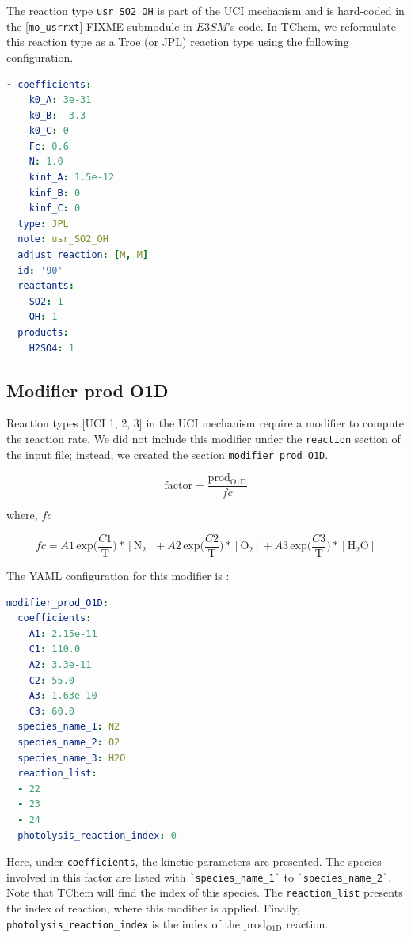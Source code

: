 \documentclass[report, 12pt]{SANDreport}
\newcommand{\eee}{E3SM}
\begin{document}
The reaction type \verb|usr_SO2_OH| is part of the UCI mechanism and is hard-coded in the [\verb|mo_usrrxt|]
FIXME%
submodule in $\eee$'s code. In TChem, we reformulate this reaction type as a Troe (or JPL) reaction type using the following configuration.

\begin{lstlisting}[language=yaml]
- coefficients:
    k0_A: 3e-31
    k0_B: -3.3
    k0_C: 0
    Fc: 0.6
    N: 1.0
    kinf_A: 1.5e-12
    kinf_B: 0
    kinf_C: 0
  type: JPL
  note: usr_SO2_OH
  adjust_reaction: [M, M]
  id: '90'
  reactants:
    SO2: 1
    OH: 1
  products:
    H2SO4: 1
\end{lstlisting}

\subsection{Modifier prod O1D}

Reaction types [UCI 1, 2, 3]
in the UCI mechanism require a modifier to compute the reaction rate. We did not include this modifier under the \verb|reaction| section of the input file; instead, we created the section \verb|modifier_prod_O1D|.

\begin{equation}
\mathrm{factor} = \frac{\mathrm{prod_{O1D}}}{fc}
\end{equation}

where, $fc$

\begin{equation}
fc = A1\, \mathrm{exp} \Big(\frac{C1}{\mathrm{T}} \Big) * [\mathrm{N_2}] +
A2\, \mathrm{exp} \Big(\frac{C2}{\mathrm{T}} \Big) * [\mathrm{O_2}] +
A3\, \mathrm{exp} \Big(\frac{C3}{\mathrm{T}} \Big) * [\mathrm{H_2O}]
\end{equation}

The YAML configuration for this modifier is :

\begin{lstlisting}[language=yaml]
modifier_prod_O1D:
  coefficients:
    A1: 2.15e-11
    C1: 110.0
    A2: 3.3e-11
    C2: 55.0
    A3: 1.63e-10
    C3: 60.0
  species_name_1: N2
  species_name_2: O2
  species_name_3: H2O
  reaction_list:
  - 22
  - 23
  - 24
  photolysis_reaction_index: 0
\end{lstlisting}
Here, under \verb|coefficients|, the kinetic parameters are presented. The species involved in this factor are listed with \verb|`species_name_1`| to \verb|`species_name_2`|. Note that TChem will find the index of this species. The \verb|reaction_list| presents the index of reaction, where this modifier is applied. Finally, \verb|photolysis_reaction_index| is the index of the $\mathrm{prod_{O1D}}$ reaction.
\end{document}
